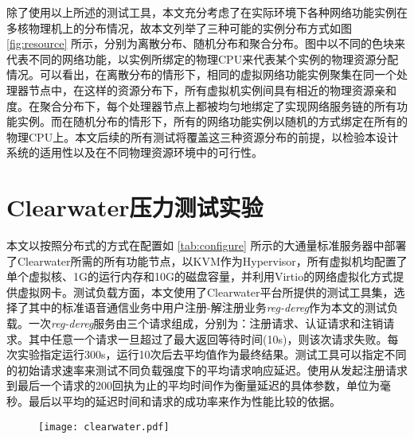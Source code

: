 \begin{figure}[!htp]
	\centering
\end{figure}
除了使用以上所述的测试工具，本文充分考虑了在实际环境下各种网络功能实例在多核物理机上的分布情况，故本文列举了三种可能的实例分布方式如图 \ref{fig:resource} 所示，分别为离散分布、随机分布和聚合分布。图中以不同的色块来代表不同的网络功能，以实例所绑定的物理CPU来代表某个实例的物理资源分配情况。可以看出，在离散分布的情形下，相同的虚拟网络功能实例聚集在同一个处理器节点中，在这样的资源分布下，所有虚拟机实例间具有相近的物理资源亲和度。在聚合分布下，每个处理器节点上都被均匀地绑定了实现网络服务链的所有功能实例。而在随机分布的情形下，所有的网络功能实例以随机的方式绑定在所有的物理CPU上。本文后续的所有测试将覆盖这三种资源分布的前提，以检验本设计系统的适用性以及在不同物理资源环境中的可行性。


\section{Clearwater压力测试实验}
本文以按照分布式的方式在配置如 \ref{tab:configure} 所示的大通量标准服务器中部署了Clearwater所需的所有功能节点，以KVM作为Hypervisor，所有虚拟机均配置了单个虚拟核、1G的运行内存和10G的磁盘容量，并利用Virtio的网络虚拟化方式提供虚拟网卡。测试负载方面，本文使用了Clearwater平台所提供的测试工具集，选择了其中的标准语音通信业务中用户注册-解注册业务\textit{reg-dereg}作为本文的测试负载。一次\textit{reg-dereg}服务由三个请求组成，分别为：注册请求、认证请求和注销请求。其中任意一个请求一旦超过了最大返回等待时间(10s)，则该次请求失败。每次实验指定运行300s，运行10次后去平均值作为最终结果。测试工具可以指定不同的初始请求速率来测试不同负载强度下的平均请求响应延迟。使用从发起注册请求到最后一个请求的200回执为止的平均时间作为衡量延迟的具体参数，单位为毫秒。最后以平均的延迟时间和请求的成功率来作为性能比较的依据。

\begin{figure}[htp]
	\centering
	\texttt{[image: clearwater.pdf]}
\end{figure}

